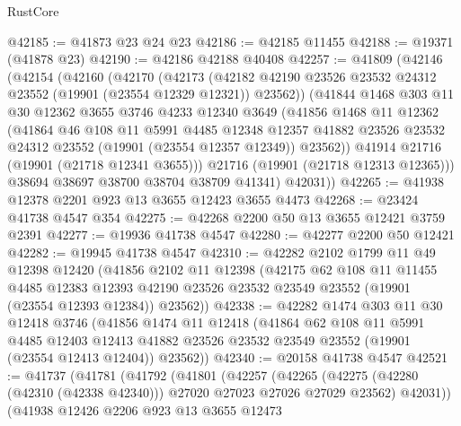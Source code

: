 \begin{lexlean}{RustCore}
\begin{coremodule}
@42185 := @41873 @23 @24 @23
@42186 := @42185 @11455
@42188 := @19371 (@41878 @23)
@42190 := @42186 @42188 @40408
@42257 := @41809
    (@42146
      (@42154
        (@42160
          (@42170
            (@42173
              (@42182 @42190 @23526 @23532 @24312 @23552 (@19901 (@23554 @12329 @12321)) @23562))
            (@41844
              @1468
              @303
              @11
              @30
              @12362
              @3655
              @3746
              @4233
              @12340
              @3649
              (@41856
                @1468
                @11
                @12362
                (@41864
                  @46
                  @108
                  @11
                  @5991
                  @4485
                  @12348
                  @12357
                  @41882
                  @23526
                  @23532
                  @24312
                  @23552
                  (@19901 (@23554 @12357 @12349))
                  @23562))
              @41914
              @21716
              (@19901 (@21718 @12341 @3655)))
            @21716
            (@19901 (@21718 @12313 @12365)))
          @38694
          @38697
          @38700
          @38704
          @38709
          @41341)
        @42031))
@42265 := @41938 @12378 @2201 @923 @13 @3655 @12423 @3655 @4473
@42268 := @23424 @41738 @4547 @354
@42275 := @42268 @2200 @50 @13 @3655 @12421 @3759 @2391
@42277 := @19936 @41738 @4547
@42280 := @42277 @2200 @50 @12421
@42282 := @19945 @41738 @4547
@42310 := @42282
    @2102
    @1799
    @11
    @49
    @12398
    @12420
    (@41856
      @2102
      @11
      @12398
      (@42175
        @62
        @108
        @11
        @11455
        @4485
        @12383
        @12393
        @42190
        @23526
        @23532
        @23549
        @23552
        (@19901 (@23554 @12393 @12384))
        @23562))
@42338 := @42282
    @1474
    @303
    @11
    @30
    @12418
    @3746
    (@41856
      @1474
      @11
      @12418
      (@41864
        @62
        @108
        @11
        @5991
        @4485
        @12403
        @12413
        @41882
        @23526
        @23532
        @23549
        @23552
        (@19901 (@23554 @12413 @12404))
        @23562))
@42340 := @20158 @41738 @4547
@42521 := @41737
    (@41781
      (@41792
        (@41801
          (@42257
            (@42265
              (@42275 (@42280 (@42310 (@42338 @42340))) @27020 @27023 @27026 @27029 @23562)
              @42031))
          (@41938
            @12426
            @2206
            @923
            @13
            @3655
            @12473

\end{coremodule}
\end{lexlean}
